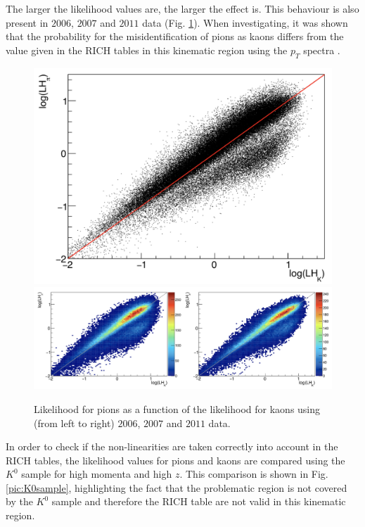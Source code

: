 The larger the likelihood values are, the larger the effect is. This behaviour is also present in $2006$, $2007$ and $2011$ data (Fig. \ref{pic:NonLinother}). When investigating, it was shown that the probability for the misidentification of pions as kaons differs from the value given in the RICH tables in this kinematic region using the $p_T$ spectra \cite{MarcinNote}.

\begin{figure}[!h]
  \centering
	\includegraphics[scale=0.2]{./gfx/RICHLH2006.png}
  \includegraphics[scale=0.3]{./gfx/RICHLH2011.png}
	\caption{Likelihood for pions as a function of the likelihood for kaons using (from left to right) $2006$, $2007$ and $2011$ data.}
	\label{pic:NonLinother}
\end{figure}

In order to check if the non-linearities are taken correctly into account in the RICH tables, the likelihood values for pions and kaons are compared using the $K^0$ sample for high momenta and high $z$. This comparison is shown in Fig. \ref{pic:K0sample}, highlighting the fact that the problematic region is not covered by the $K^0$ sample and therefore the RICH table are not valid in this kinematic region.

